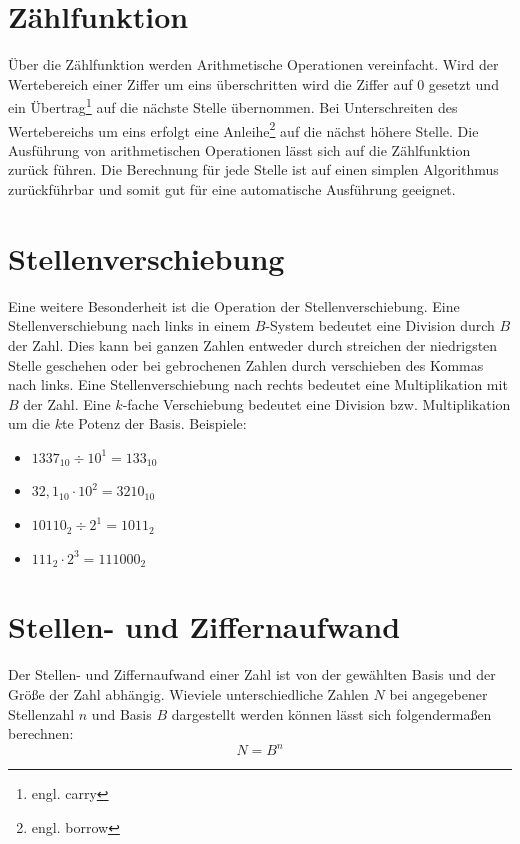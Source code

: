\documentclass[11pt,a4paper]{scrreprt}
\begin{document}
\section{Zählfunktion}
\label{Zählfunktion} 
Über die Zählfunktion werden Arithmetische Operationen vereinfacht. Wird der Wertebereich einer Ziffer um eins überschritten wird die Ziffer auf $0$ gesetzt und ein Übertrag\footnote{engl. carry} auf die nächste Stelle übernommen. Bei Unterschreiten des Wertebereichs um eins erfolgt eine Anleihe\footnote{engl. borrow} auf die nächst höhere Stelle. Die Ausführung von arithmetischen Operationen lässt sich auf die Zählfunktion zurück führen. Die Berechnung für jede Stelle ist auf einen simplen Algorithmus zurückführbar und somit gut für eine automatische Ausführung geeignet.

\section{Stellenverschiebung}
\label{stellenverschiebung}
Eine weitere Besonderheit ist die Operation der Stellenverschiebung. Eine Stellenverschiebung nach links in einem $B$-System bedeutet eine Division durch $B$ der Zahl. Dies kann bei ganzen Zahlen entweder durch streichen der niedrigsten Stelle geschehen oder bei gebrochenen Zahlen durch verschieben des Kommas nach links. Eine Stellenverschiebung nach rechts bedeutet eine Multiplikation mit $B$ der Zahl. Eine $k$-fache Verschiebung bedeutet eine Division bzw. Multiplikation um die $k$te Potenz der Basis. Beispiele:
\begin{itemize}
	\item
	$1337_{10} \div 10^1 = 133_{10}$
	
	\item 
	$32,1_{10} \cdot 10^2 = 3210_{10}$
	
	\item
	$10110_2 \div 2^1 = 1011_2$
	
	\item
	$111_2 \cdot 2^3 = 111000_2$
\end{itemize}


\section{Stellen- und Ziffernaufwand}
Der Stellen- und Ziffernaufwand einer Zahl ist von der gewählten Basis und der Größe der Zahl abhängig. Wieviele unterschiedliche Zahlen $N$ bei angegebener Stellenzahl $n$ und Basis $B$ dargestellt werden können lässt sich folgendermaßen berechnen:
$$ 
	N = B^n 
$$
\end{document}
